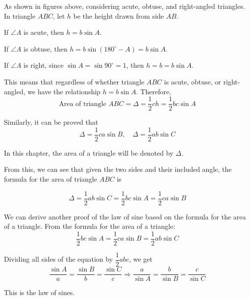 \documentclass{report}
\begin{document}
    \vspace{-1em}
    As shown in figures above, considering acute, obtuse, and right-angled triangles. In triangle $ABC$, let $h$ be the height drawn from side $AB$. 
    
    If $\angle A$ is acute, then $h = b \sin A$.

    If $\angle A$ is obtuse, then $h = b \sin (180^\circ - A) = b \sin A$.

    If $\angle A$ is right, since $\sin A = \sin 90^\circ = 1$, then $h = b = b \sin A$.

    This means that regardless of whether triangle $ABC$ is acute, obtuse, or right-angled, we have the relationship $h = b \sin A$. Therefore,
    $$
    \text{Area of triangle } ABC = \Delta = \dfrac{1}{2}ch = \dfrac{1}{2}bc\sin A
    $$

    \vspace{-1em}
    Similarly, it can be proved that
    $$
    \Delta = \dfrac{1}{2}ca\sin B, \quad \Delta = \dfrac{1}{2}ab\sin C
    $$

    \vspace{-1em}        
    In this chapter, the area of a triangle will be denoted by $\Delta$.

    From this, we can see that given the two sides and their included angle, the formula for the area of triangle $ABC$ is

    \begin{info}
        $$
        \Delta = \dfrac{1}{2}ab\sin C = \dfrac{1}{2}bc\sin A = \dfrac{1}{2}ca\sin B
        $$
    \end{info}

    We can derive another proof of the law of sine based on the formula for the area of a triangle. From the formula for the area of a triangle:
    $$
    \dfrac{1}{2}bc\sin A = \dfrac{1}{2}ca\sin B = \dfrac{1}{2}ab\sin C
    $$

    \vspace{-1em}
    Dividing all sides of the equation by $\dfrac{1}{2}abc$, we get
    $$
    \dfrac{\sin A}{a}=\dfrac{\sin B}{b}=\dfrac{\sin C}{c} \Rightarrow \dfrac{a}{\sin A}=\dfrac{b}{\sin B}=\dfrac{c}{\sin C}
    $$

    \vspace{-1em}
    This is the law of sines.
\end{document}
